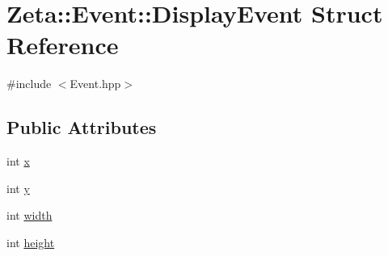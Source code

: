 \hypertarget{structZeta_1_1Event_1_1DisplayEvent}{\section{Zeta\+:\+:Event\+:\+:Display\+Event Struct Reference}
\label{structZeta_1_1Event_1_1DisplayEvent}
}


{\ttfamily \#include $<$Event.\+hpp$>$}

\subsection*{Public Attributes}
\begin{DoxyCompactItemize}
\item 
int \hyperlink{structZeta_1_1Event_1_1DisplayEvent_ad7063ad46350261a2d99a40e53713dea}{x}
\item 
int \hyperlink{structZeta_1_1Event_1_1DisplayEvent_a7554c6694a9aa0e32e40dca0be20f84b}{y}
\item 
int \hyperlink{structZeta_1_1Event_1_1DisplayEvent_a8387ebc2911a483428dd1b3f6c78ae7a}{width}
\item 
int \hyperlink{structZeta_1_1Event_1_1DisplayEvent_a7dee6ab4b0ad930516054fa39c42f3f9}{height}
\end{DoxyCompactItemize}


